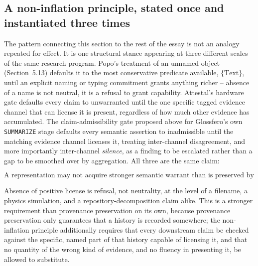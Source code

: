 \documentclass[11pt]{article}
\begin{document}
\subsection{A non-inflation principle, stated once and instantiated three times}

The pattern connecting this section to the rest of the essay is not an analogy repeated for effect. It is one structural stance appearing at three different scales of the same research program. Popo's treatment of an unnamed object (Section~5.13) defaults it to the most conservative predicate available, $\{\mathrm{Text}\}$, until an explicit naming or typing commitment grants anything richer -- absence of a name is not neutral, it is a refusal to grant capability. Attestal's hardware gate defaults every claim to unwarranted until the one specific tagged evidence channel that can license it is present, regardless of how much other evidence has accumulated. The claim-admissibility gate proposed above for Glossfero's own \texttt{SUMMARIZE} stage defaults every semantic assertion to inadmissible until the matching evidence channel licenses it, treating inter-channel disagreement, and more importantly inter-channel \emph{silence}, as a finding to be escalated rather than a gap to be smoothed over by aggregation. All three are the same claim:

\begin{equation}
\boxed{\text{A representation may not acquire stronger semantic warrant than is preserved by the constraints of its generating history.}}
\end{equation}

Absence of positive license is refusal, not neutrality, at the level of a filename, a physics simulation, and a repository-decomposition claim alike. This is a stronger requirement than provenance preservation on its own, because provenance preservation only guarantees that a history is recorded somewhere; the non-inflation principle additionally requires that every downstream claim be checked against the specific, named part of that history capable of licensing it, and that no quantity of the wrong kind of evidence, and no fluency in presenting it, be allowed to substitute.
\end{document}
